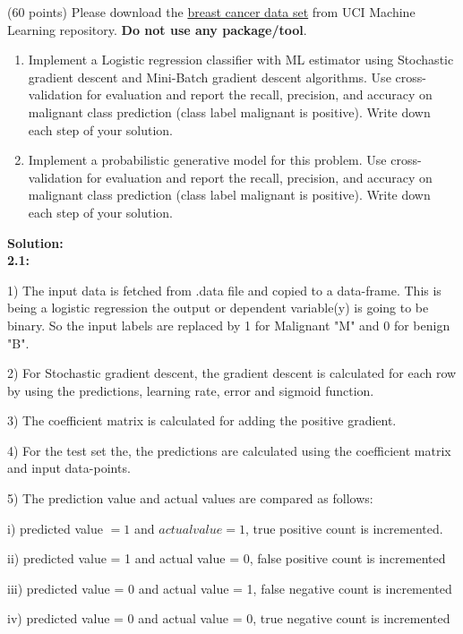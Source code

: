 \documentclass{exam}
\begin{document}
\begin{questions}
 
\newpage
{} (60 points) Please download the \href{https://archive.ics.uci.edu/ml/datasets/Breast+Cancer+Wisconsin+\%28Diagnostic\%29}{breast cancer data set} from UCI Machine Learning repository. \textbf{Do not use any package/tool}. 
\begin{enumerate}
\item Implement a Logistic regression classifier with ML estimator using Stochastic gradient descent and Mini-Batch gradient descent algorithms. Use cross-validation for evaluation and report the recall, precision, and accuracy on malignant class prediction (class label malignant is positive). Write down each step of your solution.
\item Implement a probabilistic generative model for this problem. Use cross-validation for evaluation and report the recall, precision, and accuracy on malignant class prediction (class label malignant is positive). Write down each step of your solution.
\end{enumerate}
\vspace{5em}

\textbf{Solution:}\\

\textbf{2.1:}

1) The input data is fetched from .data file and copied to a data-frame. This is being a logistic regression the output or dependent variable(y) is going to be binary. So the input labels are replaced by 1 for Malignant "M" and 0 for benign "B".

2) For Stochastic gradient descent, the gradient descent is calculated for each row by using the predictions, learning rate, error and sigmoid function.

3) The coefficient matrix is calculated for adding the positive gradient.

4) For the test set the, the predictions are calculated using the coefficient matrix and input data-points. 

5) The prediction value and actual values are compared as follows:


i) predicted value $= 1$ and $actual value = 1$, true positive count is incremented.

ii) predicted value = 1 and actual value = 0, false positive count is incremented

iii) predicted value = 0 and actual value = 1, false negative count is incremented

iv) predicted value = 0 and actual value = 0, true negative count is incremented


\end{questions}
\end{document}
